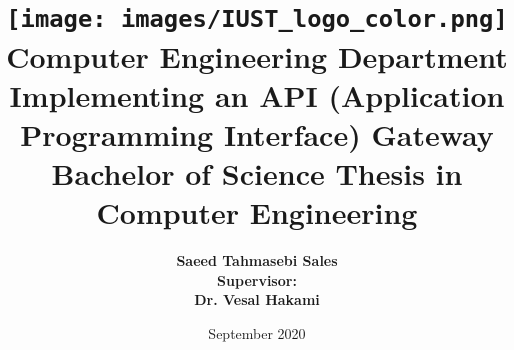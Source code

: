 \newpage
\thispagestyle{empty}
\begin{latin}
    \title{
        \center
        \texttt{[image: images/IUST\_logo\_color.png]} \\ [10pt]
        Computer Engineering Department \\ [40pt]

        \textbf{ Implementing an API (Application Programming Interface) Gateway} \\ [20pt]

        \textbf{ Bachelor of Science Thesis in Computer Engineering} \\ [60pt]

    }

    \author{
        \center
        \textbf{Saeed Tahmasebi Sales} \\ [30pt]


        \textbf{Supervisor:} \\ [10pt]
        \textbf{Dr. Vesal Hakami} \\ [40pt]
    }
    \center
    \date{
        \center
        September 2020
    }

\end{latin}
